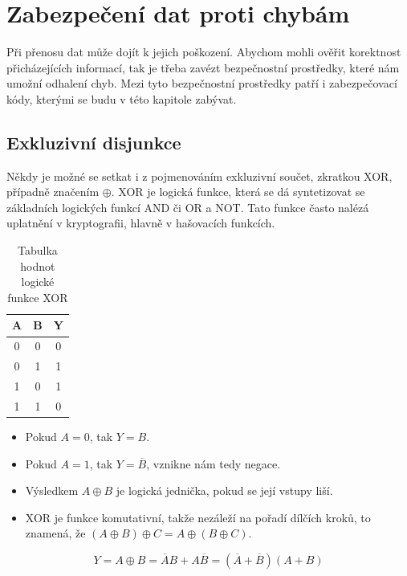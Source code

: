 \chapter{Zabezpečení dat proti chybám}
Při přenosu dat může dojít k jejich poškození. Abychom mohli ověřit korektnost přicházejících informací, tak je třeba zavézt bezpečnostní prostředky, které nám umožní odhalení chyb. Mezi tyto bezpečnostní prostředky patří i zabezpečovací kódy, kterými se budu v této kapitole zabývat.


\section{Exkluzivní disjunkce}
Někdy je možné se setkat i z pojmenováním exkluzivní součet, zkratkou XOR, případně značením $\oplus$. XOR je logická funkce, která se dá syntetizovat se základních logických funkcí AND či OR a NOT. Tato funkce často nalézá uplatnění v kryptografii, hlavně v hašovacích funkcích.

\begin{table}[!h]
  \caption{Tabulka hodnot logické funkce XOR}
  \begin{center}
  	\small
	  \begin{tabular}{|c|c||c|}
	    \hline
	    A & B & Y \\
	    \hline\hline
	    0 & 0 & 0 \\
	    \hline
	    0 & 1 & 1 \\
	    \hline
	    1 & 0 & 1 \\
	    \hline
	    1 & 1 & 0 \\
	    \hline
	  \end{tabular}
  \end{center}
\end{table}

\begin{itemize}
    \item Pokud $A = 0$, tak $Y = B$.
    \item Pokud $A = 1$, tak $Y = \overline{B}$, vznikne nám tedy negace.
    \item Výsledkem  $A \oplus B $ je logická jednička, pokud se její vstupy liší.
    \item XOR je funkce komutativní, takže nezáleží na pořadí dílčích kroků, to znamená, že $(A \oplus B) \oplus C = A \oplus (B \oplus C)$.
\end{itemize}

$$ Y = A \oplus B = \overline{A}B + A\overline{B} = (\overline{A} + \overline{B}) (A + B) $$




